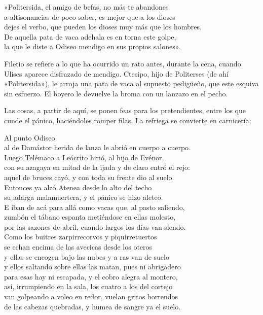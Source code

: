 \begin{versocita}
«Politersida, el amigo de befas, no más te abandones\\
a altisonancias de poco saber, es mejor que a los dioses\\
dejes el verbo, que pueden los dioses muy más que los hombres.\\
De aquella pata de vaca adehala es en torna este golpe,\\
la que le diste a Odiseo mendigo en sus propios salones».
\end{versocita}

Filetio se refiere a lo que ha ocurrido un rato antes, durante la cena, cuando Ulises aparece disfrazado de mendigo. Ctesipo, hijo de Politerses (de ahí «Politersida»), le arroja una pata de vaca al supuesto pedigüeño, que este esquiva sin esfuerzo. El boyero le devuelve la broma con un lanzazo en el pecho.

Las cosas, a partir de aquí, se ponen feas para los pretendientes, entre los que cunde el pánico, haciéndoles romper filas. La refriega se convierte en carnicería:

\begin{versocita}
[...] Al punto Odiseo\\
al de Damástor herida de lanza le abrió en cuerpo a cuerpo.\\
Luego Telémaco a Leócrito hirió, al hijo de Evénor,\\
con su azagaya en mitad de la ijada y de claro entró el rejo:\\
aquel de bruces cayó, y con toda su frente dio al suelo.\\
Entonces ya alzó Atenea desde lo alto del techo\\
su adarga malamuertera, y el pánico se hizo aleteo.\\
E iban de acá para allá como vacas que, al pasto saliendo,\\
zumbón el tábano espanta metiéndose en ellas molesto,\\
por las sazones de abril, cuando largos los días van siendo.\\
Como los buitres zarpirrecorvos y piquirretuertos\\
se echan encima de las avecicas desde los oteros\\
y ellas se encogen bajo las nubes y a ras van de suelo\\
y ellos saltando sobre ellas las matan, pues ni abrigadero\\
para esas hay ni escapada, y el cobro alegra al montero,\\
así, irrumpiendo en la sala, los cuatro a los del cortejo\\
van golpeando a voleo en redor, vuelan gritos horrendos\\
de las cabezas quebradas, y humea de sangre ya el suelo.
\end{versocita}

